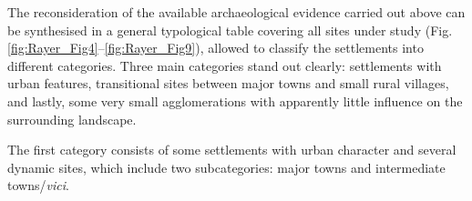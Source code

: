 The reconsideration of the available archaeological evidence carried out above can be synthesised in a general typological table covering all sites under study (Fig. \ref{fig:Rayer_Fig4}--\ref{fig:Rayer_Fig9}), allowed to classify the settlements into different categories. Three main categories stand out clearly: settlements with urban features, transitional sites between major towns and small rural villages, and lastly, some very small agglomerations with apparently little influence on the surrounding landscape.

The first category consists of some settlements with urban character and several dynamic sites, which include two subcategories: major towns and intermediate towns/\textit{vici}.

